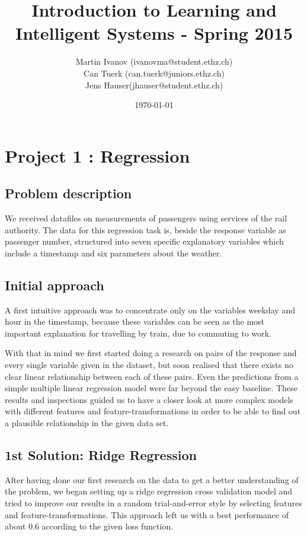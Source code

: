 \documentclass[a4paper, 11pt]{article}
\title{Introduction to Learning and Intelligent Systems - Spring 2015}
\author{Martin Ivanov (ivanovma@student.ethz.ch)\\ Can Tuerk (can.tuerk@juniors.ethz.ch)\\ Jens Hauser(jhauser@student.ethz.ch)\\}
\date{\today}
\begin{document}
\maketitle

\section*{Project 1 : Regression}

\subsection*{Problem description}
We received datafiles on measurements of passengers using services of the rail authority. The data for this regression task is, beside the response variable as passenger number, structured into seven specific explanatory variables which include a timestamp and six parameters about the weather.

\subsection*{Initial approach}
A first intuitive approach was to concentrate only on the variables weekday and hour in the timestamp, because these variables can be seen as the most important explanation for travelling by train, due to commuting to work.

With that in mind we first started doing a research on pairs of the response and every single variable given in the dataset, but soon realised that there exists no clear linear relationship between each of these pairs. Even the predictions from a simple multiple linear regression model were far beyond the easy baseline. These results and inspections guided us to have a closer look at more complex models with different features and feature-transformations in order to be able to find out a plausible relationship in the given data set.

\subsection*{1st Solution: Ridge Regression}
After having done our first research on the data to get a better understanding of the problem, we began setting up a ridge regression cross validation model and tried to improve our results in a random trial-and-error style by selecting features and feature-transformations. This approach left us with a best performance of about 0.6 according to the given loss function.
\end{document}

